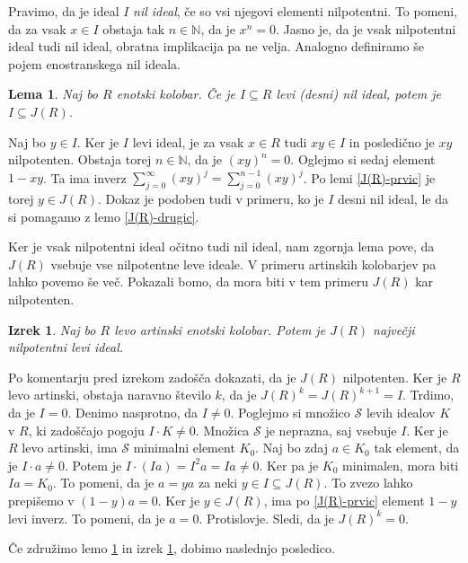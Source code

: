 \documentclass[a4paper, 12pt]{amsart}
\theoremstyle{definition} %
\theoremstyle{plain} %
\newtheorem{lema}[definicija]{Lema}
\newtheorem{izrek}[definicija]{Izrek}
\newcommand{\N}{\mathbb N}
\begin{document}
Pravimo, da je ideal $I$ \emph{nil ideal}, če so vsi njegovi elementi nilpotentni. To pomeni, da za vsak $x\in I$ obstaja tak $n\in \N$, da je $x^n =0$. Jasno je, da je vsak nilpotentni ideal tudi nil ideal, obratna implikacija pa ne velja.
Analogno definiramo še pojem enostranskega nil ideala.

\begin{lema}
\label{nilPodJ(R)}
Naj bo $R$ enotski kolobar. Če je $I\subseteq R$ levi (desni) nil ideal, potem je $I\subseteq J(R)$.
\end{lema}

\proof
Naj bo $y\in I$. Ker je $I$ levi ideal, je za vsak $x\in R$ tudi $xy \in I$ in posledično je $xy$ nilpotenten. Obstaja torej $n\in \N$, da je $(xy)^n = 0$. Oglejmo si sedaj element $1-xy$. Ta ima inverz $\sum_{j=0}^{\infty} (xy)^j = \sum_{j=0}^{n-1} (xy)^j$. Po lemi \ref{J(R)-prvic} je torej $y \in J(R)$. Dokaz je podoben tudi v primeru, ko je $I$ desni nil ideal, le da si pomagamo z lemo \ref{J(R)-drugic}.
\endproof

Ker je vsak nilpotentni ideal očitno tudi nil ideal, nam zgornja lema pove, da $J(R)$ vsebuje vse nilpotentne leve ideale. V primeru artinskih kolobarjev pa lahko povemo še več. Pokazali bomo, da mora biti v tem primeru $J(R)$ kar nilpotenten.

\begin{izrek}
\label{J(R)nilpotenten-levoArtinski}
Naj bo $R$ levo artinski enotski kolobar. Potem je $J(R)$ največji nilpotentni levi ideal.
\end{izrek}

\proof
Po komentarju pred izrekom zadošča dokazati, da je $J(R)$ nilpotenten. Ker je $R$ levo artinski, obstaja naravno število $k$, da je $J(R)^k = J(R) ^{k+1} = I$. Trdimo, da je $I=0$. Denimo nasprotno, da $I\neq 0$. Poglejmo si množico $\mathcal{S}$ levih idealov $K$ v $R$, ki zadoščajo pogoju $I\cdot K \neq 0$. Množica $\mathcal{S}$ je neprazna, saj vsebuje $I$. Ker je $R$ levo artinski, ima $\mathcal{S}$ minimalni element $K_0$. Naj bo zdaj $a\in K_0$ tak element, da je $I\cdot a \neq 0$. Potem je $I\cdot (Ia) = I^2 a = Ia \neq 0$. Ker pa je $K_0$ minimalen, mora biti $Ia = K_0$. To pomeni, da je $a = ya$ za neki $y\in I \subseteq J(R)$. To zvezo lahko prepišemo v $(1-y)a = 0$. Ker je $y\in J(R)$, ima po \ref{J(R)-prvic} element $1-y$ levi inverz. To pomeni, da je $a=0$. Protislovje. Sledi, da je $J(R)^k = 0$.
\endproof

Če združimo lemo \ref{nilPodJ(R)} in izrek \ref{J(R)nilpotenten-levoArtinski}, dobimo naslednjo posledico.
\end{document}
